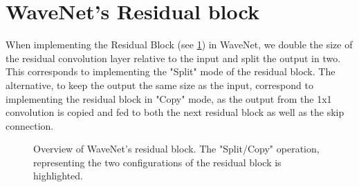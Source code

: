 \section{WaveNet's Residual block}\label{appx:residual-stack}
When implementing the Residual Block (see \cref{fig:wavenet-res-block}) in WaveNet, we double the size of the residual convolution layer relative to the input and split the output in two.
This corresponds to implementing the "Split" mode of the residual block.
The alternative, to keep the output the same size as the input, correspond to implementing the residual block in "Copy" mode, as the output from the 1x1 convolution is copied and fed to both the next residual block as well as the skip connection. 


\begin{figure}
    \centering
    
    \caption{
    Overview of WaveNet's residual block. 
    The "Split/Copy" operation, representing the two configurations of the residual block is highlighted.
    }
    \label{fig:wavenet-res-block}
\end{figure}